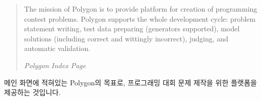 \documentclass{article}
\begin{document}
    \begin{quotation}
        The mission of Polygon is to provide platform for creation of programming contest problems. Polygon supports the whole development cycle: 
        problem statement writing,
        test data preparing (generators supported),
        model solutions (including correct and wittingly incorrect),
        judging, and
        automatic validation.
        \begin{flushright}
            \textit{Polygon Index Page}
        \end{flushright}
    \end{quotation}
    메인 화면에 적혀있는 Polygon의 목표로, 프로그래밍 대회 문제 제작을 위한 플랫폼을 제공하는 것입니다.
\end{document}
